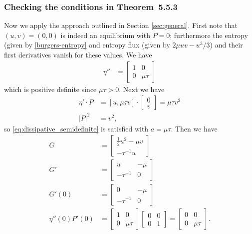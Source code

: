 \documentclass{article}
\theoremstyle{plain}
\theoremstyle{definition}
\numberwithin{theorem}{section}
\begin{document}
\subsubsection{Checking the conditions in Theorem~5.5.3}
Now we apply the approach outlined in Section \ref{sec:general}.
First note that $(u,v) = (0,0)$ is indeed an equilibrium with $P=0$;
furthermore the entropy (given by \eqref{burgers-entropy} and entropy flux
(given by $2\mu uv - u^3/3$) and their first derivatives vanish for these values.
We have
\begin{align}
    \eta'' & = \begin{bmatrix}
        1 & 0 \\ 0 & \mu \tau
    \end{bmatrix}
\end{align}
which is positive definite since $\mu \tau >0$.
Next we have
\begin{align}
    \eta' \cdot P & = [u, \mu \tau v] \cdot  \begin{bmatrix} 0 \\ v \end{bmatrix} = \mu \tau v^2 \\
    |P|^2 & = v^2,
\end{align}
so \eqref{eq:dissipative_semidefinite} is satisfied with $a = \mu \tau$.
Then we have
\begin{align}
    G & = \begin{bmatrix} \frac{1}{2} u^2 -\mu v \\ -\tau^{-1} u \end{bmatrix} \\
   G' & = \begin{bmatrix} u & -\mu \\ -\tau^{-1} &  0 \end{bmatrix} \\
   G'(0) & = \begin{bmatrix} 0 & -\mu \\ -\tau^{-1} &  0 \end{bmatrix} \\
   \eta''(0) P'(0) & = \begin{bmatrix} 1 & 0 \\ 0 & \mu \tau \end{bmatrix}
    \begin{bmatrix} 0 & 0 \\ 0 & 1 \end{bmatrix} =
    \begin{bmatrix} 0 & 0 \\ 0 & \mu \tau \end{bmatrix}.
\end{align}
\end{document}
